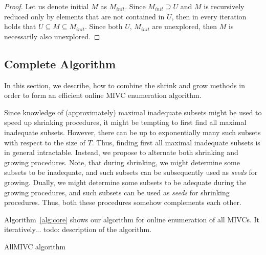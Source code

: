 \begin{proof}
Let us denote initial $M$ as $M_{init}$. Since $M_{init} \supseteq U$ and $M$ is recursively reduced only by elements that are not contained in $U$, then in every iteration holds that $U \subseteq M \subseteq M_{init}$. Since both $U, \, M_{init}$ are unexplored, then $M$ is necessarily also unexplored. 
\end{proof}


\subsection{Complete Algorithm}
In this section, we describe, how to combine the shrink and grow methods in order to form an efficient online MIVC enumeration algorithm.

Since knowledge of (approximately) maximal inadequate subsets might be used to speed up shrinking procedures, it might be tempting to first find all maximal inadequate subsets. However, there can be up to exponentially many such subsets with respect to the size of $T$. Thus, finding first all maximal inadequate subsets is in general intractable. Instead, we propose to alternate both shrinking and growing procedures. Note, that during shrinking, we might determine some subsets to be inadequate, and such subsets can be subsequently used as \emph{seeds} for growing. Dually, we might determine some subsets to be adequate during the growing procedures, and such subsets can be used as \emph{seeds} for shrinking procedures. Thus, both these procedures somehow complements each other. 

Algorithm~\ref{alg:core} shows our algorithm for online enumeration of all MIVCs. It iteratively... todo: description of the algorithm.


\begin{algorithm}[!t]

\caption{AllMIVC algorithm}
\end{algorithm}




 
